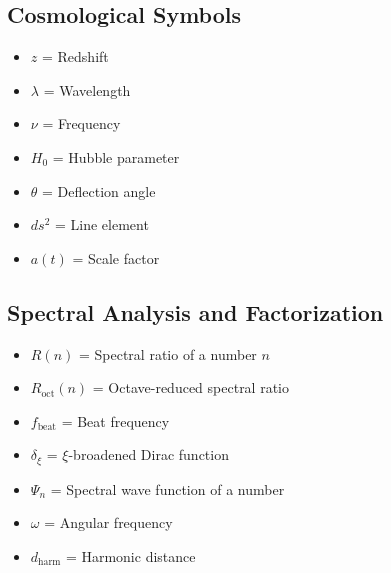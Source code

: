 \documentclass[12pt,a4paper]{article}
\begin{document}
	\subsection{Cosmological Symbols}
	\begin{itemize}
		\item $z$ = Redshift
		\item $\lambda$ = Wavelength
		\item $\nu$ = Frequency
		\item $H_0$ = Hubble parameter
		\item $\theta$ = Deflection angle
		\item $ds^2$ = Line element
		\item $a(t)$ = Scale factor
	\end{itemize}
	
	\subsection{Spectral Analysis and Factorization}
	\begin{itemize}
		\item $R(n)$ = Spectral ratio of a number $n$
		\item $R_{\text{oct}}(n)$ = Octave-reduced spectral ratio
		\item $f_{\text{beat}}$ = Beat frequency
		\item $\delta_\xi$ = $\xi$-broadened Dirac function
		\item $\Psi_n$ = Spectral wave function of a number
		\item $\omega$ = Angular frequency
		\item $d_{\text{harm}}$ = Harmonic distance
	\end{itemize}
	
\end{document}
